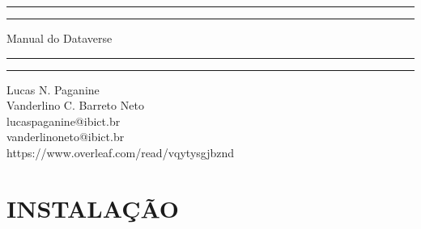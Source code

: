 \documentclass[12pt,hidelinks]{article}
\begin{document}
\begin{titlepage}
	\centering %
	\scshape %
	\vspace*{1.5\baselineskip} %

	\rule{13cm}{1.6pt}\vspace*{-\baselineskip}\vspace*{2pt} %
	\rule{13cm}{0.4pt} %
	
		\vspace{0.75\baselineskip} %
	{	\Huge Manual do Dataverse\\ 
			\vspace{4mm}}
		\vspace{0.75\baselineskip} %
	\rule{13cm}{0.4pt}\vspace*{-\baselineskip}\vspace{3.2pt} %
	\rule{13cm}{1.6pt} %
	
		\vspace{1.75\baselineskip} %
	{\large Lucas N. Paganine\\ Vanderlino C. Barreto Neto \\
		\vspace*{1.2\baselineskip}
	lucaspaganine@ibict.br\\ vanderlinoneto@ibict.br} \\https://www.overleaf.com/read/vqytysgjbznd
	\vfill
\end{titlepage}
\tableofcontents
\vfill
\newpage
{}

\section{INSTALAÇÃO}
\vspace{10.5cm}
\end{document}
